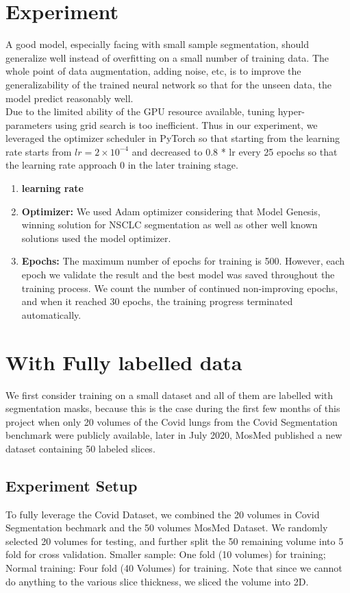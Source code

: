 \section{Experiment}
A good model, especially facing with small sample segmentation, should generalize well instead of overfitting on a small number of training data. The whole point of data augmentation, adding noise, etc, is to improve the generalizability of the trained neural network so that for the unseen data, the model predict reasonably well.\\

Due to the limited ability of the GPU resource available, tuning hyper-parameters using grid search is too inefficient. Thus in our experiment, we leveraged the optimizer scheduler in PyTorch so that starting from the learning rate starts from $lr=2\times10^{-4}$ and decreased to 0.8 * lr every 25 epochs so that the learning rate approach 0 in the later training stage.  
\begin{enumerate}
	\item \textbf{learning rate}
	\item \textbf{Optimizer:} We used Adam optimizer considering that Model Genesis, winning solution for NSCLC segmentation as well as other well known solutions used the model optimizer.
	\item \textbf{Epochs:} The maximum number of epochs for training is 500. However, each epoch we validate the result and the best model was saved throughout the training process. We count the number of continued non-improving epochs, and when it reached 30 epochs, the training progress terminated automatically.
	\end{enumerate}

\section{With Fully labelled data}
We first consider training on a small dataset and all of them are labelled with segmentation masks, because this is the case during the first few months of this project when only 20 volumes of the Covid lungs from the Covid Segmentation benchmark were publicly available, later in July 2020, MosMed published a new dataset containing 50 labeled slices.

\subsection{Experiment Setup}
To fully leverage the Covid Dataset, we combined the 20 volumes in Covid Segmentation bechmark and the 50 volumes MosMed Dataset. We randomly selected 20 volumes for testing, and further split the 50 remaining volume into 5 fold for cross validation. Smaller sample: One fold (10 volumes) for training; Normal training: Four fold (40 Volumes) for training.
Note that since we cannot do anything to the various slice thickness, we sliced the volume into 2D.

